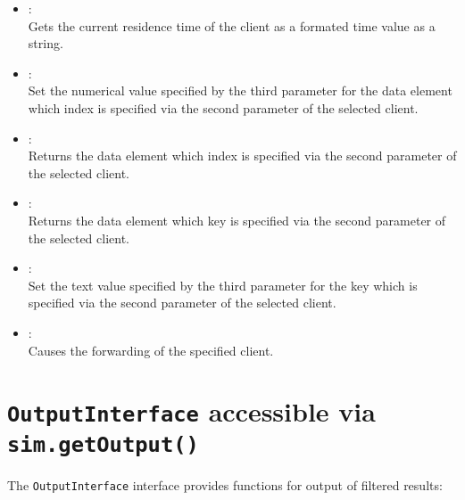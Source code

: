 \begin{itemize}
\item
{}:\\
Gets the current residence time of the client as a formated time value as a string.

\item
{}:\\
Set the numerical value specified by the third parameter for the data element which index is specified via the second parameter of the selected client.

\item
{}:\\
Returns the data element which index is specified via the second parameter of the selected client.

\item
{}:\\
Returns the data element which key is specified via the second parameter of the selected client.

\item
{}:\\
Set the text value specified by the third parameter for the key which is specified via the second parameter of the selected client.

\item
{}:\\
Causes the forwarding of the specified client.

\end{itemize}


\chapter{\texttt{OutputInterface} accessible via \texttt{sim.getOutput()}}

The \texttt{OutputInterface} interface provides functions for output of filtered results:


